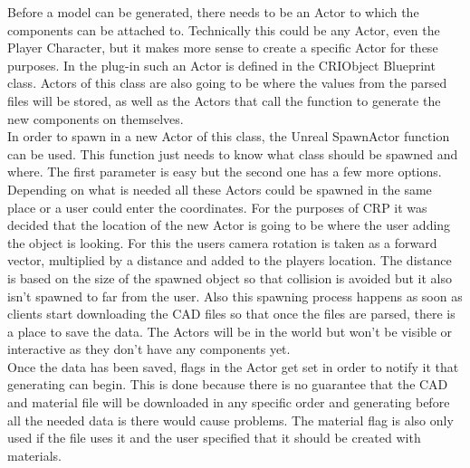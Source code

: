 Before a model can be generated, there needs to be an Actor to which the components can be attached to. Technically this could be any Actor, even the Player Character, but it makes more sense to create a specific Actor for these purposes. In the plug-in such an Actor is defined in the CRIObject Blueprint class. Actors of this class are also going to be where the values from the parsed files will be stored, as well as the Actors that call the function to generate the new components on themselves.\\
In order to spawn in a new Actor of this class, the Unreal SpawnActor function can be used. This function just needs to know what class should be spawned and where. The first parameter is easy but the second one has a few more options. Depending on what is needed all these Actors could be spawned in the same place or a user could enter the coordinates. For the purposes of CRP it was decided that the location of the new Actor is going to be where the user adding the object is looking. For this the users camera rotation is taken as a forward vector, multiplied by a distance and added to the players location. The distance is based on the size of the spawned object so that collision is avoided but it also isn't spawned to far from the user. Also this spawning process happens as soon as clients start downloading the CAD files so that once the files are parsed, there is a place to save the data. The Actors will be in the world but won't be visible or interactive as they don't have any components yet.\\
Once the data has been saved, flags in the Actor get set in order to notify it that generating can begin. This is done because there is no guarantee that the CAD and material file will be downloaded in any specific order and generating before all the needed data is there would cause problems. The material flag is also only used if the file uses it and the user specified that it should be created with materials.\\
